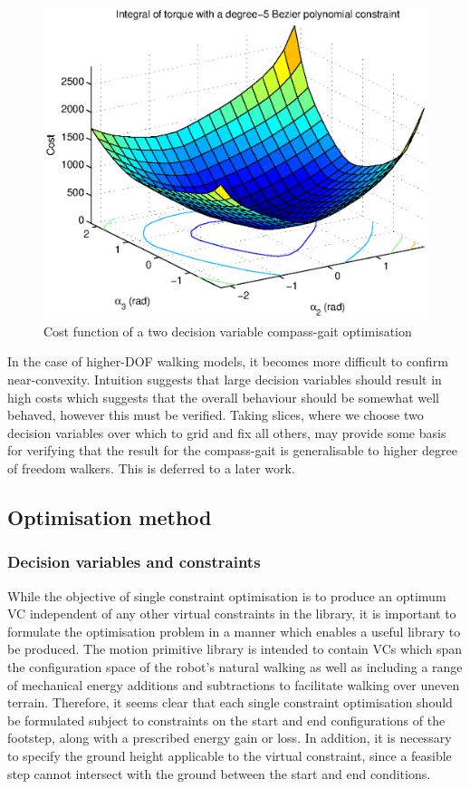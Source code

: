 \begin{figure}
	\centering
	\includegraphics[width=0.6\linewidth]{4VirtConstLib/CGgrid.eps}
	\caption{Cost function of a two decision variable compass-gait optimisation}
	\label{fig:cggridtorque}
\end{figure}

In the case of higher-DOF walking models, it becomes more difficult to confirm near-convexity. Intuition suggests that large decision variables should result in high costs which suggests that the overall behaviour should be somewhat well behaved, however this must be verified. Taking slices, where we choose two decision variables over which to grid and fix all others, may provide some basis for verifying that the result for the compass-gait is generalisable to higher degree of freedom walkers. This is deferred to a later work.

\subsection{Optimisation method} \label{sec:optmethod}
\subsubsection{Decision variables and constraints}
While the objective of single constraint optimisation is to produce an optimum VC independent of any other virtual constraints in the library, it is important to formulate the optimisation problem in a manner which enables a useful library to be produced. The motion primitive library is intended to contain VCs which span the configuration space of the robot's natural walking as well as including a range of mechanical energy additions and subtractions to facilitate walking over uneven terrain. Therefore, it seems clear that each single constraint optimisation should be formulated subject to constraints on the start and end configurations of the footstep, along with a prescribed energy gain or loss. In addition, it is necessary to specify the ground height applicable to the virtual constraint, since a feasible step cannot intersect with the ground between the start and end conditions.

